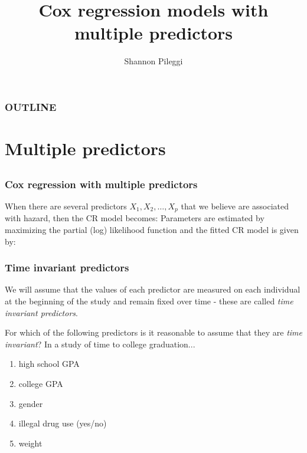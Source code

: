 



\title[Set 10]{Cox regression models with multiple predictors}
\author[Pileggi]{Shannon Pileggi}


\date{}




\begin{frame}
\titlepage
\end{frame}

\begin{frame}
\frametitle{OUTLINE\qquad\qquad\qquad} \tableofcontents[hideallsubsections]
\end{frame}


\section[Multiple predictors]{Multiple predictors}
\subsection{}

\begin{frame}
\frametitle{Cox regression with multiple predictors}
When there are several predictors $X_1,X_2,\ldots,X_p$ that we believe are associated with hazard, then the CR model becomes:
\vskip60pt
Parameters are estimated by maximizing the partial (log) likelihood function and the fitted CR model is given by:
\vskip60pt
\end{frame}

\begin{frame}
\frametitle{Time invariant predictors}
We will assume that the values of each predictor are measured on each individual at the beginning of the study and remain fixed over time - these are called \emph{time invariant predictors}.
\begin{clicker}{For which of the following predictors is it reasonable to assume that they are \emph{time invariant}?  In a study of time to college graduation...}
\begin{enumerate}
\item high school GPA
\item college GPA
\item gender
\item illegal drug use (yes/no)
\item weight
\end{enumerate}
\end{clicker}
\end{frame}


